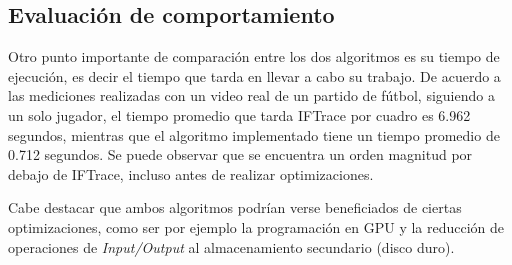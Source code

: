 \subsection{Evaluación de comportamiento}

Otro punto importante de comparación entre los dos algoritmos es su tiempo de
ejecución, es decir el tiempo que tarda en llevar a cabo su trabajo.  De
acuerdo a las mediciones realizadas con un video real de un partido de fútbol,
siguiendo a un solo jugador, el tiempo promedio que tarda IFTrace por cuadro es
6.962 segundos, mientras que el algoritmo implementado tiene un tiempo promedio
de 0.712 segundos. Se puede observar que se encuentra un orden magnitud por
debajo de IFTrace, incluso antes de realizar optimizaciones.

Cabe destacar que ambos algoritmos podrían verse beneficiados de ciertas
optimizaciones, como ser por ejemplo la programación en GPU y la reducción de
operaciones de \textit{Input/Output} al almacenamiento secundario (disco duro).
